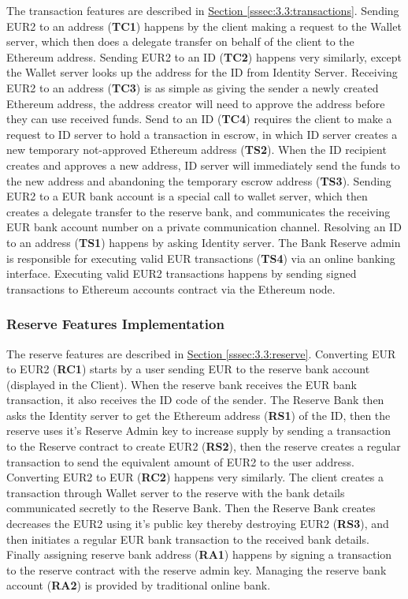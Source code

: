 \documentclass[a4paper,12pt]{article} %
\newcommand{\hypersectionref}[1]{\hyperref[#1]{Section \ref{#1}}}
\begin{document}
{The transaction features are described in \hypersectionref{sssec:3.3:transactions}. Sending EUR2 to an address (\textbf{TC1}) happens by the client making a request to the Wallet server, which then does a delegate transfer on behalf of the client to the Ethereum address. Sending EUR2 to an ID (\textbf{TC2}) happens very similarly, except the Wallet server looks up the address for the ID from Identity Server. Receiving EUR2 to an address (\textbf{TC3}) is as simple as giving the sender a newly created Ethereum address, the address creator will need to approve the address before they can use received funds. Send to an ID (\textbf{TC4}) requires the client to make a request to ID server to hold a transaction in escrow, in which ID server creates a new temporary not-approved Ethereum address (\textbf{TS2}). When the ID recipient creates and approves a new address, ID server will immediately send the funds to the new address and abandoning the temporary escrow address (\textbf{TS3}). Sending EUR2 to a EUR bank account is a special call to wallet server, which then creates a delegate transfer to the reserve bank, and communicates the receiving EUR bank account number on a private communication channel. Resolving an ID to an address (\textbf{TS1}) happens by asking Identity server. The Bank Reserve admin is responsible for executing valid EUR transactions (\textbf{TS4}) via an online banking interface. Executing valid EUR2 transactions happens by sending signed transactions to Ethereum accounts contract via the Ethereum node.

\subsubsection{Reserve Features Implementation} \label{sssec:3.6:reserve}

The reserve features are described in \hypersectionref{sssec:3.3:reserve}. Converting EUR to EUR2 (\textbf{RC1}) starts by a user sending EUR to the reserve bank account (displayed in the Client). When the reserve bank receives the EUR bank transaction, it also receives the ID code of the sender. The Reserve Bank then asks the Identity server to get the Ethereum address (\textbf{RS1}) of the ID, then the reserve uses it's Reserve Admin key to increase supply by sending a transaction to the Reserve contract to create EUR2 (\textbf{RS2}), then the reserve creates a regular transaction to send the equivalent amount of EUR2 to the user address.  Converting EUR2 to EUR (\textbf{RC2}) happens very similarly. The client creates a transaction through Wallet server to the reserve with the bank details communicated secretly to the Reserve Bank. Then the Reserve Bank creates decreases the EUR2 using it's public key thereby destroying EUR2 (\textbf{RS3}), and then initiates a regular EUR bank transaction to the received bank details. Finally assigning reserve bank address (\textbf{RA1}) happens by signing a transaction to the reserve contract with the reserve admin key. Managing the reserve bank account (\textbf{RA2}) is provided by traditional online bank.

}
\end{document}
